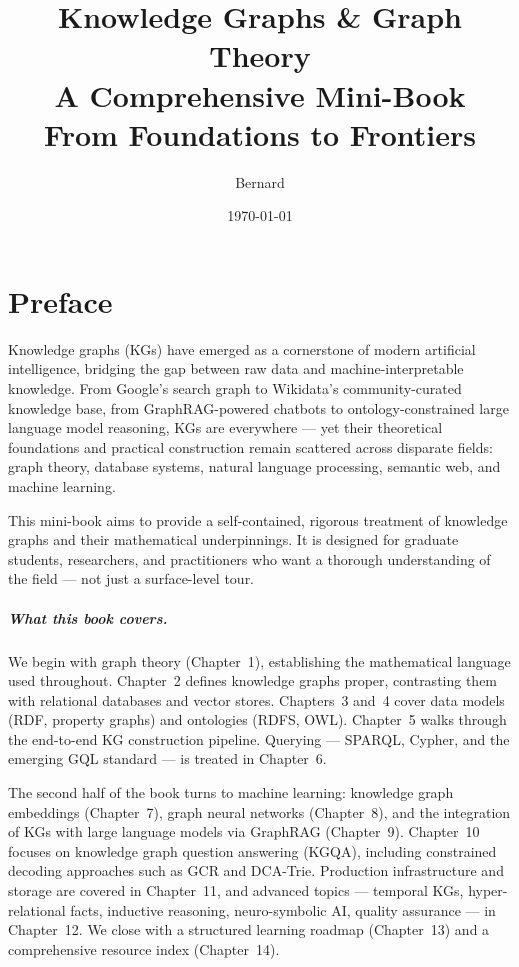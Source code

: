 \documentclass[11pt,a4paper,oneside,openany]{book}
\title{\Huge Knowledge Graphs \& Graph Theory\\[10pt]
       \Large A Comprehensive Mini-Book\\[20pt]
       \large From Foundations to Frontiers}
\author{Bernard}
\date{\today}
\theoremstyle{definition}
\theoremstyle{plain}
\theoremstyle{remark}
\begin{document}
\frontmatter
\maketitle

\tableofcontents

\chapter{Preface}

Knowledge graphs (KGs) have emerged as a cornerstone of modern artificial intelligence, bridging the gap between raw data and machine-interpretable knowledge. From Google's search graph to Wikidata's community-curated knowledge base, from GraphRAG-powered chatbots to ontology-constrained large language model reasoning, KGs are everywhere --- yet their theoretical foundations and practical construction remain scattered across disparate fields: graph theory, database systems, natural language processing, semantic web, and machine learning.

This mini-book aims to provide a self-contained, rigorous treatment of knowledge graphs and their mathematical underpinnings. It is designed for graduate students, researchers, and practitioners who want a thorough understanding of the field --- not just a surface-level tour.

\paragraph*{What this book covers.}
We begin with graph theory (Chapter~1), establishing the mathematical language used throughout. Chapter~2 defines knowledge graphs proper, contrasting them with relational databases and vector stores. Chapters~3 and~4 cover data models (RDF, property graphs) and ontologies (RDFS, OWL). Chapter~5 walks through the end-to-end KG construction pipeline. Querying --- SPARQL, Cypher, and the emerging GQL standard --- is treated in Chapter~6.

The second half of the book turns to machine learning: knowledge graph embeddings (Chapter~7), graph neural networks (Chapter~8), and the integration of KGs with large language models via GraphRAG (Chapter~9). Chapter~10 focuses on knowledge graph question answering (KGQA), including constrained decoding approaches such as GCR and DCA-Trie. Production infrastructure and storage are covered in Chapter~11, and advanced topics --- temporal KGs, hyper-relational facts, inductive reasoning, neuro-symbolic AI, quality assurance --- in Chapter~12. We close with a structured learning roadmap (Chapter~13) and a comprehensive resource index (Chapter~14).
\end{document}
